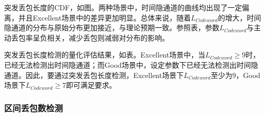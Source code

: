 突发丢包长度的CDF，如图。两种场景中，时间隐通道的曲线均出现了一定偏离，并且Excellent场景中的差异更加明显。总体来说，随着$L_{Codeword}$的增大，时间隐通道的分布与原始分布更加接近，与理论预期一致。参照表，参数$L_{Codeword}$与主动丢包率呈负相关，减少丢包则减弱对分布的影响。

突发丢包长度检测的量化评估结果，如表。Excellent场景中，当$L_{Codeword}\ge 9$时，已经无法检测出时间隐通道；而Good场景中，设定参数下已经无法检测出时间隐通道。因此，要通过突发丢包长度检测，Excellent场景下$L_{Codeword}$至少为9，Good场景下$L_{Codeword}\ge 7$即可满足要求。

\subsubsection{区间丢包数检测}
\label{chap:zigzag:results:undetectability:win}


